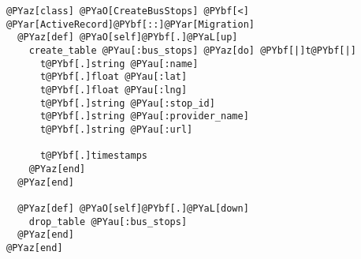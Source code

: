\begin{Verbatim}[commandchars=@\[\]]
@PYaz[class] @PYaO[CreateBusStops] @PYbf[<] @PYar[ActiveRecord]@PYbf[::]@PYar[Migration]
  @PYaz[def] @PYaO[self]@PYbf[.]@PYaL[up]
    create_table @PYau[:bus_stops] @PYaz[do] @PYbf[|]t@PYbf[|]
      t@PYbf[.]string @PYau[:name]
      t@PYbf[.]float @PYau[:lat]
      t@PYbf[.]float @PYau[:lng]
      t@PYbf[.]string @PYau[:stop_id]
      t@PYbf[.]string @PYau[:provider_name]
      t@PYbf[.]string @PYau[:url]
      
      t@PYbf[.]timestamps
    @PYaz[end]
  @PYaz[end]

  @PYaz[def] @PYaO[self]@PYbf[.]@PYaL[down]
    drop_table @PYau[:bus_stops]
  @PYaz[end]
@PYaz[end]
\end{Verbatim}
